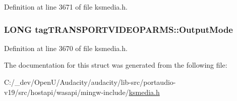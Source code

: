 Definition at line 3671 of file ksmedia.\+h.

\subsubsection[{\texorpdfstring{Output\+Mode}{OutputMode}}]{\setlength{\rightskip}{0pt plus 5cm}L\+O\+NG tag\+T\+R\+A\+N\+S\+P\+O\+R\+T\+V\+I\+D\+E\+O\+P\+A\+R\+M\+S\+::\+Output\+Mode}\hypertarget{structtag_t_r_a_n_s_p_o_r_t_v_i_d_e_o_p_a_r_m_s_a9f5f53da03d07d8dbf68200f1a18c21e}{}\label{structtag_t_r_a_n_s_p_o_r_t_v_i_d_e_o_p_a_r_m_s_a9f5f53da03d07d8dbf68200f1a18c21e}


Definition at line 3670 of file ksmedia.\+h.



The documentation for this struct was generated from the following file\+:\begin{DoxyCompactItemize}
\item 
C\+:/\+\_\+dev/\+Open\+U/\+Audacity/audacity/lib-\/src/portaudio-\/v19/src/hostapi/wasapi/mingw-\/include/\hyperlink{ksmedia_8h}{ksmedia.\+h}\end{DoxyCompactItemize}
